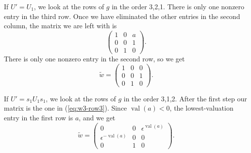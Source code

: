 \documentclass{amsart}
\theoremstyle{definition}
\def\e{\epsilon}
\def\w{\widetilde{w}}
\def\val{\mathop{\mathrm{val}}}
\begin{document}
  If $U' = U_1$, we look at the rows of $g$ in the order 3,2,1.  There is only
  one nonzero entry in the third row.  Once we have eliminated the other
  entries in the second column, the matrix we are left with is
  \begin{equation}\label{eq:w3-row3}
    \begin{pmatrix}
      1 & 0 & a \\
      0 & 0 & 1 \\
      0 & 1 & 0
    \end{pmatrix}.
  \end{equation}
  There is only one nonzero entry in the second row, so we get 
  \begin{equation*}
    \w = \begin{pmatrix}
      1 & 0 & 0 \\
      0 & 0 & 1 \\
      0 & 1 & 0
    \end{pmatrix}.
  \end{equation*}

  If $U' = s_1 U_1 s_1$, we look at the rows of $g$ in the order 3,1,2.  After
  the first step our matrix is the one in (\ref{eq:w3-row3}).  Since
  $\val(a) < 0$, the lowest-valuation entry in the first row is $a$, and we get
  \begin{equation*}
    \w = \begin{pmatrix}
      0 & 0 & \e^{\val(a)} \\
      \e^{-\val(a)} & 0 & 0 \\
      0 & 1 & 0
    \end{pmatrix}.
  \end{equation*}
\end{document}
